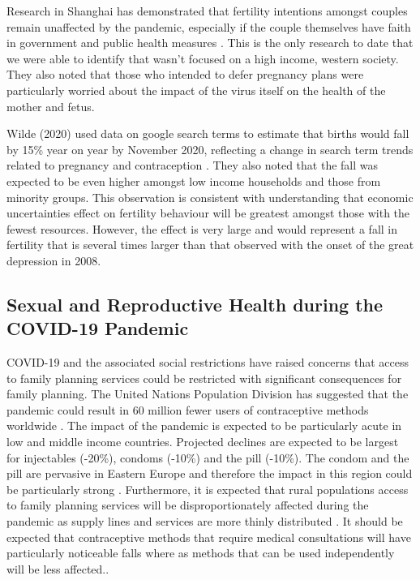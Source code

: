 \documentclass[10pt,letterpaper]{article}
\begin{document}
Research in Shanghai has demonstrated that fertility intentions amongst couples remain unaffected by the pandemic, especially if the couple themselves have faith in government and public health measures \cite{zhu2020fertility}. This is the only research to date that we were able to identify that wasn't focused on a high income, western society. They also noted that those who intended to defer pregnancy plans were particularly worried about the impact of the virus itself on the health of the mother and fetus.

Wilde (2020) used data on google search terms to estimate that births would fall by 15\% year on year by November 2020, reflecting a change in search term trends related to pregnancy and contraception \cite{wilde2020covid}. They also noted that the fall was expected to be even higher amongst low income households and those from minority groups. This observation is consistent with understanding that economic uncertainties effect on fertility behaviour will be greatest amongst those with the fewest resources. However, the effect is very large and would represent a fall in fertility that is several times larger than that observed with the onset of the great depression in 2008.

\subsection*{Sexual and Reproductive Health during the COVID-19 Pandemic}

COVID-19 and the associated social restrictions have raised concerns that access to family planning services could be restricted with significant consequences for family planning. The United Nations Population Division has suggested that the pandemic could result in 60 million fewer users of contraceptive methods worldwide \cite{dasgupta2020impact}. The impact of the pandemic is expected to be particularly acute in low and middle income countries. Projected declines are expected to be largest for injectables (-20\%), condoms (-10\%) and the pill (-10\%). The condom and the pill are pervasive in Eastern Europe and therefore the impact in this region could be particularly strong \cite{eeckhaut2014using}. Furthermore, it is expected that rural populations access to family planning services will be disproportionately affected during the pandemic as supply lines and services are more thinly distributed \cite{dasgupta2020impact}. It should be expected that contraceptive methods that require medical consultations will have particularly noticeable falls where as methods that can be used independently will be less affected..
\end{document}
